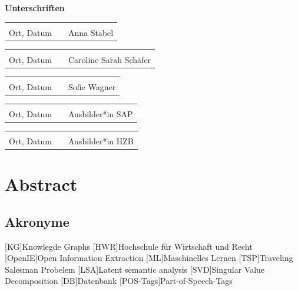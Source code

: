\documentclass[12pt, oneside]{article}
\newcommand{\studentNameOne}{Anna Stabel}
\newcommand{\studentNameTwo}{Caroline Sarah Schäfer}
\newcommand{\studentNameThree}{Sofie Wagner}
\begin{document}
\newpage
\textbf{Unterschriften}
\newline

\begin{tabular}{lp{4em}l} 
 \hspace{5cm}   && \hspace{4cm} \\\cline{1-1}\cline{3-3} 
Ort, Datum     && \studentNameOne 
\end{tabular}

\begin{tabular}{lp{4em}l} 
 \hspace{5cm}   && \hspace{4cm} \\\cline{1-1}\cline{3-3} 
Ort, Datum     && \studentNameTwo
\end{tabular}

\begin{tabular}{lp{4em}l} 
 \hspace{5cm}   && \hspace{4cm} \\\cline{1-1}\cline{3-3} 
Ort, Datum     && \studentNameThree 
\end{tabular}

\begin{tabular}{lp{4em}l} 
 \hspace{5cm}   && \hspace{4cm} \\\cline{1-1}\cline{3-3} 
Ort, Datum     && Ausbilder*in SAP 
\end{tabular}

\begin{tabular}{lp{4em}l} 
 \hspace{5cm}   && \hspace{4cm} \\\cline{1-1}\cline{3-3} 
Ort, Datum     && Ausbilder*in HZB
\end{tabular}

\newpage

\section*{Abstract}
%
\noindent


\newpage

\tableofcontents
\newpage

\begin{acronym}[ECU]
\section*{Akronyme}

    [KG]{Knowlegde Graphs}
    [HWR]{Hochschule für Wirtschaft und Recht}
    [OpenIE]{Open Information Extraction}
    [ML]{Maschinelles Lernen}
    [TSP]{Traveling Salesman Probelem}
    [LSA]{Latent semantic analysis}
    [SVD]{Singular Value Decomposition}
    [DB]{Datenbank}
    [POS-Tags]{Part-of-Speech-Tags}
\end{acronym}
\end{document}
